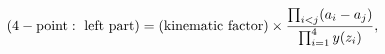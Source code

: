 \begin{equation}
({\rm 4-point:~left~part}) = ({\rm kinematic~factor}) \times
 {\prod_{i < j}(a_i-a_j) \over \prod_{i=1}^4 y(z_i)
} ,
\end{equation}


